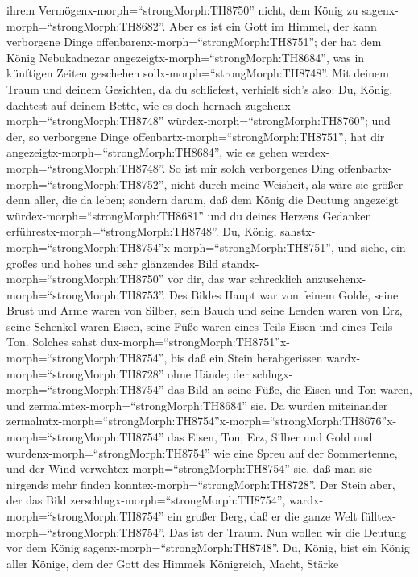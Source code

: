 ihrem Vermögenx-morph=``strongMorph:TH8750'' nicht, dem König zu
sagenx-morph=``strongMorph:TH8682''.  Aber es ist ein Gott
im Himmel, der kann verborgene Dinge
offenbarenx-morph=``strongMorph:TH8751''; der hat dem König Nebukadnezar
angezeigtx-morph=``strongMorph:TH8684'', was in künftigen Zeiten
geschehen sollx-morph=``strongMorph:TH8748''.  Mit deinem
Traum und deinem Gesichten, da du schliefest, verhielt sich's also: Du,
König, dachtest auf deinem Bette, wie es doch hernach
zugehenx-morph=``strongMorph:TH8748''
würdex-morph=``strongMorph:TH8760''; und der, so verborgene Dinge
offenbartx-morph=``strongMorph:TH8751'', hat dir
angezeigtx-morph=``strongMorph:TH8684'', wie es gehen
werdex-morph=``strongMorph:TH8748''.  So ist mir solch
verborgenes Ding offenbartx-morph=``strongMorph:TH8752'', nicht durch
meine Weisheit, als wäre sie größer denn aller, die da leben; sondern
darum, daß dem König die Deutung angezeigt
würdex-morph=``strongMorph:TH8681'' und du deines Herzens Gedanken
erführestx-morph=``strongMorph:TH8748''.  Du, König,
sahstx-morph=``strongMorph:TH8754''x-morph=``strongMorph:TH8751'', und
siehe, ein großes und hohes und sehr glänzendes Bild
standx-morph=``strongMorph:TH8750'' vor dir, das war schrecklich
anzusehenx-morph=``strongMorph:TH8753''.  Des Bildes Haupt
war von feinem Golde, seine Brust und Arme waren von Silber, sein Bauch
und seine Lenden waren von Erz,  seine Schenkel waren
Eisen, seine Füße waren eines Teils Eisen und eines Teils Ton.
 Solches sahst
dux-morph=``strongMorph:TH8751''x-morph=``strongMorph:TH8754'', bis daß
ein Stein herabgerissen wardx-morph=``strongMorph:TH8728'' ohne Hände;
der schlugx-morph=``strongMorph:TH8754'' das Bild an seine Füße, die
Eisen und Ton waren, und zermalmtex-morph=``strongMorph:TH8684'' sie.
 Da wurden miteinander
zermalmtx-morph=``strongMorph:TH8754''\textbar x-morph=``strongMorph:TH8676''x-morph=``strongMorph:TH8754''
das Eisen, Ton, Erz, Silber und Gold und
wurdenx-morph=``strongMorph:TH8754'' wie eine Spreu auf der Sommertenne,
und der Wind verwehtex-morph=``strongMorph:TH8754'' sie, daß man sie
nirgends mehr finden konntex-morph=``strongMorph:TH8728''. Der Stein
aber, der das Bild zerschlugx-morph=``strongMorph:TH8754'',
wardx-morph=``strongMorph:TH8754'' ein großer Berg, daß er die ganze
Welt fülltex-morph=``strongMorph:TH8754''.  Das ist der
Traum. Nun wollen wir die Deutung vor dem König
sagenx-morph=``strongMorph:TH8748''.  Du, König, bist ein
König aller Könige, dem der Gott des Himmels Königreich, Macht, Stärke

